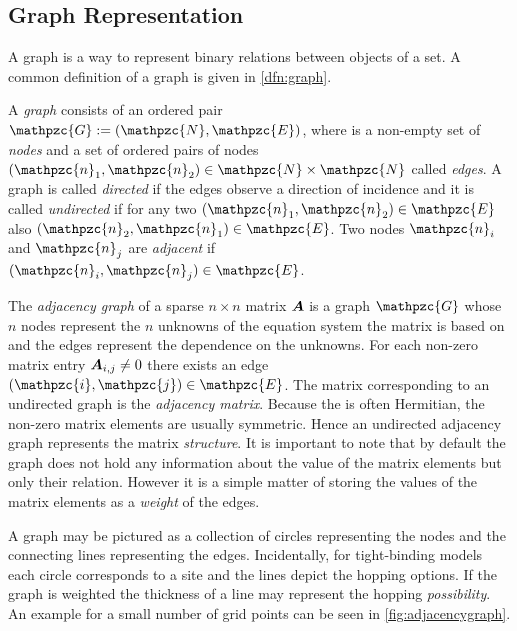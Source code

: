 \subsection{Graph Representation}
A graph is a way to represent binary relations between objects of a set. A common definition of a graph is given in \cref{dfn:graph}.
\begin{dfn}\label{dfn:graph}
A \emph{graph}  consists of an ordered pair $\mathpzc{G} :=(\mathpzc{N},\mathpzc{E})$, where  is a non-empty set of \emph{nodes}  and  a set of ordered pairs of nodes $(\mathpzc{n}_1,\mathpzc{n}_2) \in \mathpzc{N} \times \mathpzc{N}$ called \emph{edges}.
A graph is called \emph{directed} if the edges observe a direction of incidence  and it is called \emph{undirected} if for any two $(\mathpzc{n}_1,\mathpzc{n}_2) \in \mathpzc{E}$ also $(\mathpzc{n}_2,\mathpzc{n}_1) \in \mathpzc{E}$.
Two nodes $\mathpzc{n}_i$ and $\mathpzc{n}_j$ are \emph{adjacent} if $(\mathpzc{n}_i,\mathpzc{n}_j) \in \mathpzc{E}$. \cite{graham1995handbook}
\end{dfn}
The \emph{adjacency graph} of a sparse $n \times n$ matrix $\boldsymbol{A}$ is a graph $\mathpzc{G}$ whose $n$ nodes represent the $n$ unknowns of the equation system the matrix is based on and the edges represent the dependence on the unknowns. For each non-zero matrix entry $\boldsymbol{A}_{i,j}\neq 0$ there exists an edge $(\mathpzc{i},\mathpzc{j}) \in \mathpzc{E}$. The matrix corresponding to an undirected graph is the \emph{adjacency matrix}. Because the \hamil{} is often Hermitian, the non-zero matrix elements are usually symmetric. Hence an undirected adjacency graph represents the matrix \emph{structure}. It is important to note that by default the graph does not hold any information about the value of the matrix elements but only their relation. However it is a simple matter of storing the values of the matrix elements as a \emph{weight} of the edges.\par
A graph may be pictured as a collection of circles representing the nodes and the connecting lines representing the edges. Incidentally, for tight-binding models each circle corresponds to a site and the lines depict the hopping options. If the graph is weighted the thickness of a line may represent the hopping \emph{possibility}. An example for a small number of grid points can be seen in \cref{fig:adjacencygraph}.
